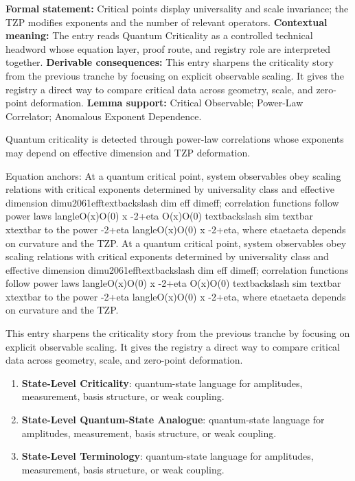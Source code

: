 \begingroup\footnotesize\setlength{\emergencystretch}{3em}\sloppy
\textbf{Formal statement:} Critical points display universality and scale invariance; the TZP modifies exponents and the number of relevant operators. \textbf{Contextual meaning:} The entry reads Quantum Criticality as a controlled technical headword whose equation layer, proof route, and registry role are interpreted together. \textbf{Derivable consequences:} This entry sharpens the criticality story from the previous tranche by focusing on explicit observable scaling. It gives the registry a direct way to compare critical data across geometry, scale, and zero-point deformation. \textbf{Lemma support:} Critical Observable; Power-Law Correlator; Anomalous Exponent Dependence.\par
\endgroup

Quantum criticality is detected through power-law correlations whose exponents may depend on effective dimension and TZP deformation.

Equation anchors: At a quantum critical point, system observables obey scaling relations with critical exponents determined by universality class and effective dimension dimu2061efftextbackslash dim eff dimeff; correlation functions follow power laws langleO(x)O(0)  x -2+eta O(x)O(0) textbackslash sim textbar xtextbar to the power -2+eta langleO(x)O(0)  x -2+eta, where etaetaeta depends on curvature and the TZP. At a quantum critical point, system observables obey scaling relations with critical exponents determined by universality class and effective dimension dimu2061efftextbackslash dim eff dimeff; correlation functions follow power laws langleO(x)O(0)  x -2+eta O(x)O(0) textbackslash sim textbar xtextbar to the power -2+eta langleO(x)O(0)  x -2+eta, where etaetaeta depends on curvature and the TZP.

This entry sharpens the criticality story from the previous tranche by focusing on explicit observable scaling. It gives the registry a direct way to compare critical data across geometry, scale, and zero-point deformation.
\endgroup

\begingroup\footnotesize\sloppy
\begin{enumerate}[leftmargin=1.35em,itemsep=1pt,topsep=1pt,parsep=0pt]
\item \textbf{State-Level Criticality}: quantum-state language for amplitudes, measurement, basis structure, or weak coupling.
\item \textbf{State-Level Quantum-State Analogue}: quantum-state language for amplitudes, measurement, basis structure, or weak coupling.
\item \textbf{State-Level Terminology}: quantum-state language for amplitudes, measurement, basis structure, or weak coupling.
\end{enumerate}
\endgroup

